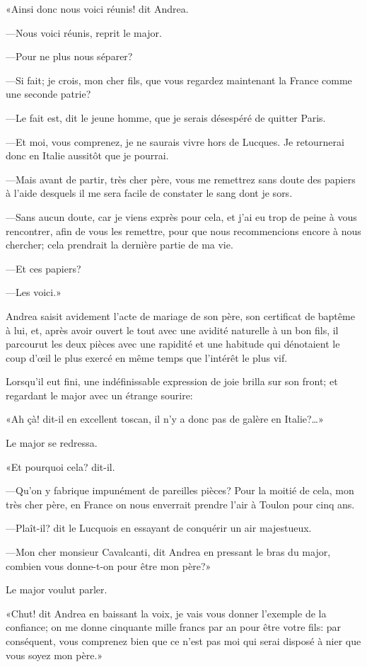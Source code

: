 «Ainsi donc nous voici réunis! dit Andrea. 

—Nous voici réunis, reprit le major. 

—Pour ne plus nous séparer? 

—Si fait; je crois, mon cher fils, que vous regardez maintenant la France comme une seconde patrie? 

—Le fait est, dit le jeune homme, que je serais désespéré de quitter Paris. 

—Et moi, vous comprenez, je ne saurais vivre hors de Lucques. Je retournerai donc en Italie aussitôt que je pourrai. 

—Mais avant de partir, très cher père, vous me remettrez sans doute des papiers à l'aide desquels il me sera facile de constater le sang dont je sors. 

—Sans aucun doute, car je viens exprès pour cela, et j'ai eu trop de peine à vous rencontrer, afin de vous les remettre, pour que nous recommencions encore à nous chercher; cela prendrait la dernière partie de ma vie. 

—Et ces papiers? 

—Les voici.» 

Andrea saisit avidement l'acte de mariage de son père, son certificat de baptême à lui, et, après avoir ouvert le tout avec une avidité naturelle à un bon fils, il parcourut les deux pièces avec une rapidité et une habitude qui dénotaient le coup d'œil le plus exercé en même temps que l'intérêt le plus vif. 

Lorsqu'il eut fini, une indéfinissable expression de joie brilla sur son front; et regardant le major avec un étrange sourire: 

«Ah çà! dit-il en excellent toscan, il n'y a donc pas de galère en Italie?\dots» 

Le major se redressa. 

«Et pourquoi cela? dit-il. 

—Qu'on y fabrique impunément de pareilles pièces? Pour la moitié de cela, mon très cher père, en France on nous enverrait prendre l'air à Toulon pour cinq ans. 

—Plaît-il? dit le Lucquois en essayant de conquérir un air majestueux. 

—Mon cher monsieur Cavalcanti, dit Andrea en pressant le bras du major, combien vous donne-t-on pour être mon père?» 

Le major voulut parler. 

«Chut! dit Andrea en baissant la voix, je vais vous donner l'exemple de la confiance; on me donne cinquante mille francs par an pour être votre fils: par conséquent, vous comprenez bien que ce n'est pas moi qui serai disposé à nier que vous soyez mon père.» 

